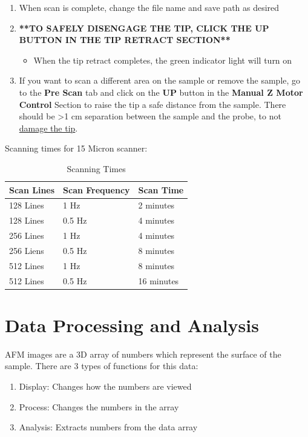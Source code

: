 \documentclass{../lab}
\begin{document}
\begin{enumerate}
    \item When scan is complete, change the file name and save path as desired
    
    \item\textbf{**TO SAFELY DISENGAGE THE TIP, CLICK THE UP BUTTON IN THE TIP RETRACT SECTION**}
    \begin{itemize}
        \item When the tip retract completes, the green indicator light will turn on
    \end{itemize}
    
    \item If you want to scan a different area on the sample or remove the sample, go to the \textbf{Pre Scan }tab and click on the \textbf{UP }button in the \textbf{Manual Z Motor Control }Section to raise the tip a safe distance from the sample.  There should be >1 cm separation between the sample and the probe, to not \hyperref[subsec:BrokenTip]{damage the tip}.
\end{enumerate}

Scanning times for 15 Micron scanner:

\begin{table}[H]
    \centering
    \begin{tabular}{l|l|l}
        Scan Lines & Scan Frequency & Scan Time \\\hline
        128 Lines  & 1 Hz           & 2 minutes \\\hline
        128 Lines  & 0.5 Hz         & 4 minutes \\\hline
        256 Lines  & 1 Hz           & 4 minutes \\\hline
        256 Liens  & 0.5 Hz         & 8 minutes \\\hline
        512 Lines  & 1 Hz           & 8 minutes \\\hline
        512 Lines  & 0.5 Hz         & 16 minutes
    \end{tabular}
    \caption{Scanning Times}
\end{table}

\section{Data Processing and Analysis}
\label{sec:DataProcessingAndAnalysis}

AFM images are a 3D array of numbers which represent the surface of the sample.  There are 3 types of functions for this data:
\begin{enumerate}
    \item Display: Changes how the numbers are viewed
    
    \item Process: Changes the numbers in the array
    
    \item Analysis: Extracts numbers from the data array
\end{enumerate}
\end{document}
